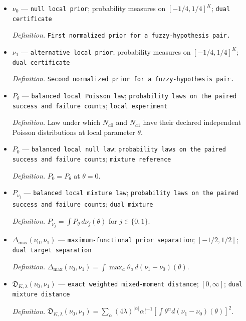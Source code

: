 \documentclass{article}
\begin{document}
\begin{itemize}
  \par\smallskip\noindent\emph{Definition.} \(\mathcal W_{K,\lambda}(P_L)=\sup_{\theta\in[-1/4,1/4]^K}\sum_{\alpha\ne0}(4\lambda)^{-|\alpha|}(D^\alpha P_L(\theta))^2/\alpha!\).
  \item \(\nu_0\) --- \texttt{null local prior}; probability measures on \([-1/4,1/4]^K\); \texttt{dual certificate}
  \par\smallskip\noindent\emph{Definition.} \texttt{First normalized prior for a fuzzy-\allowbreak{}hypothesis pair.}
  \item \(\nu_1\) --- \texttt{alternative local prior}; probability measures on \([-1/4,1/4]^K\); \texttt{dual certificate}
  \par\smallskip\noindent\emph{Definition.} \texttt{Second normalized prior for a fuzzy-\allowbreak{}hypothesis pair.}
  \item \(P_\theta\) --- \texttt{balanced local Poisson law}; \texttt{probability laws on the paired success and failure counts}; \texttt{local experiment}
  \par\smallskip\noindent\emph{Definition.} Law under which \(N_{a0}\) and \(N_{a1}\) have their declared independent Poisson distributions at local parameter \(\theta\).
  \item \(P_0\) --- \texttt{balanced local null law}; \texttt{probability laws on the paired success and failure counts}; \texttt{mixture reference}
  \par\smallskip\noindent\emph{Definition.} \(P_0=P_\theta\) at \(\theta=0\).
  \item \(P_{\nu_j}\) --- \texttt{balanced local mixture law}; \texttt{probability laws on the paired success and failure counts}; \texttt{dual mixture}
  \par\smallskip\noindent\emph{Definition.} \(P_{\nu_j}=\int P_\theta\,d\nu_j(\theta)\) for \(j\in\{0,1\}\).
  \item \(\Delta_{\max}(\nu_0,\nu_1)\) --- \texttt{maximum-\allowbreak{}functional prior separation}; \([-1/2,1/2]\); \texttt{dual target separation}
  \par\smallskip\noindent\emph{Definition.} \(\Delta_{\max}(\nu_0,\nu_1)=\int\max_a\theta_a\,d(\nu_1-\nu_0)(\theta)\).
  \item \(\mathfrak D_{K,\lambda}(\nu_0,\nu_1)\) --- \texttt{exact weighted mixed-\allowbreak{}moment distance}; \([0,\infty]\); \texttt{dual mixture distance}
  \par\smallskip\noindent\emph{Definition.} \(\mathfrak D_{K,\lambda}(\nu_0,\nu_1)=\sum_{\alpha}(4\lambda)^{|\alpha|}\alpha!^{-1}[\int\theta^\alpha d(\nu_1-\nu_0)(\theta)]^2\).

\end{itemize}
\end{document}
